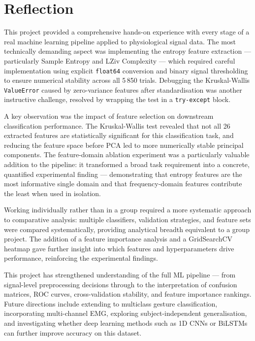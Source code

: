 \section{Reflection}

This project provided a comprehensive hands-on experience with every stage of a real machine
learning pipeline applied to physiological signal data. The most technically demanding aspect
was implementing the entropy feature extraction --- particularly Sample Entropy and LZiv
Complexity --- which required careful implementation using explicit \texttt{float64} conversion
and binary signal thresholding to ensure numerical stability across all 5\,850 trials.
Debugging the Kruskal-Wallis \texttt{ValueError} caused by zero-variance features after
standardisation was another instructive challenge, resolved by wrapping the test in a
\texttt{try-except} block.

A key observation was the impact of feature selection on downstream classification performance.
The Kruskal-Wallis test revealed that not all 26 extracted features are statistically significant
for this classification task, and reducing the feature space before PCA led to more numerically
stable principal components. The feature-domain ablation experiment was a particularly valuable
addition to the pipeline: it transformed a broad task requirement into a concrete, quantified
experimental finding --- demonstrating that entropy features are the most informative single
domain and that frequency-domain features contribute the least when used in isolation.

Working individually rather than in a group required a more systematic approach to comparative
analysis: multiple classifiers, validation strategies, and feature sets were compared
systematically, providing analytical breadth equivalent to a group project. The addition of a
feature importance analysis and a GridSearchCV heatmap gave further insight into which features
and hyperparameters drive performance, reinforcing the experimental findings.

This project has strengthened understanding of the full ML pipeline --- from signal-level
preprocessing decisions through to the interpretation of confusion matrices, ROC curves,
cross-validation stability, and feature importance rankings. Future directions include extending
to multiclass gesture classification, incorporating multi-channel EMG, exploring subject-independent
generalisation, and investigating whether deep learning methods such as 1D CNNs or BiLSTMs can
further improve accuracy on this dataset.
